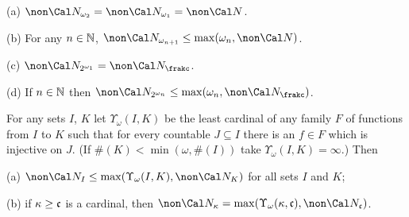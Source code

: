 (a) $\non\Cal N_{\omega_2}=\non\Cal N_{\omega_1}=\non\Cal N$.

(b) For any $n\in\Bbb N$,
$\non\Cal N_{\omega_{n+1}}\le\max(\omega_n,\non\Cal N)$.

(c) $\non\Cal N_{2^{\omega_1}}=\non\Cal N_{\frakc}$.

(d) If $n\in\Bbb N$ then
$\non\Cal N_{2^{\omega_n}}\le\max(\omega_n,\non\Cal N_{\frakc})$.


For any sets $I$, $K$ let
$\Upsilon_{\omega}(I,K)$ be the least cardinal of any family $F$ of
functions from $I$ to $K$ such that for every countable $J\subseteq I$
there is an $f\in F$ which is injective on $J$.   (If
$\#(K)<\min(\omega,\#(I))$ take $\Upsilon_{\omega}(I,K)=\infty$.)   Then

(a) $\non\Cal N_I\le\max(\Upsilon_{\omega}(I,K),\non\Cal N_K)$ for all sets
$I$ and $K$;

(b) if $\kappa\ge\frak c$ is a cardinal, then
$\non\Cal N_{\kappa}
=\max(\Upsilon_{\omega}(\kappa,\frak c),\non\Cal N_{\frak c})$.

